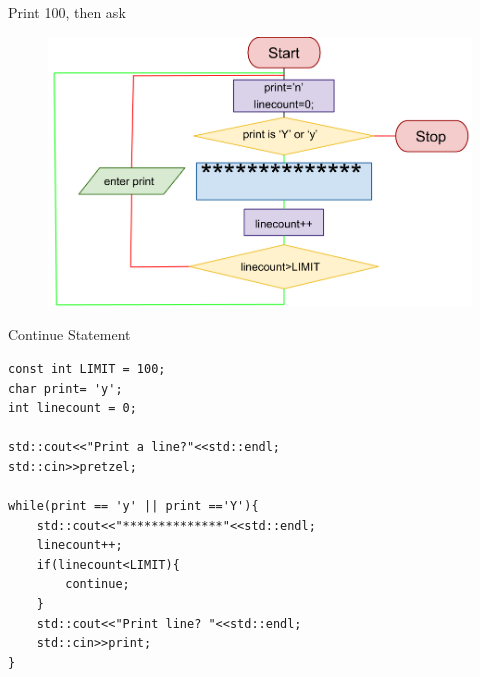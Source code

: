 \documentclass[xcolor={dvipsnames}]{beamer}
\begin{document}
\begin{frame}{Print 100, then ask}
	\begin{figure}
		\includegraphics[width=1\textwidth]{continue_line}
	\end{figure}
\end{frame}


\begin{frame}[fragile]{Continue Statement}
\begin{verbatim}
const int LIMIT = 100;
char print= 'y';
int linecount = 0;

std::cout<<"Print a line?"<<std::endl;
std::cin>>pretzel;

while(print == 'y' || print =='Y'){
    std::cout<<"**************"<<std::endl;
    linecount++;
    if(linecount<LIMIT){
        continue;
    }
    std::cout<<"Print line? "<<std::endl;
    std::cin>>print;
}
\end{verbatim}
\end{frame}
\end{document}
